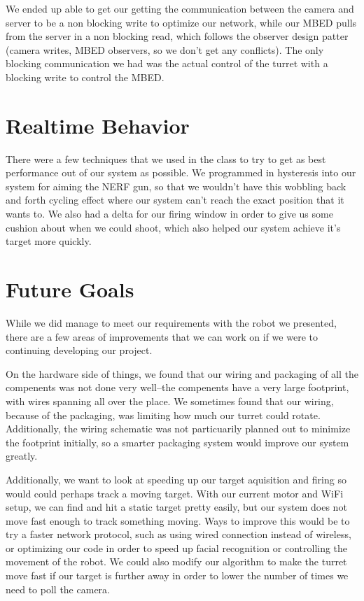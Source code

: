 \documentclass[journal]{IEEEtran}
\begin{document}
We ended up able to get our getting the communication between the camera and server to be a non blocking write to optimize our network, while our MBED pulls from the server in a non blocking read, which follows the observer design patter (camera writes, MBED observers, so we don't get any conflicts). The only blocking communication we had was the actual control of the turret with a blocking write to control the MBED.



\section{Realtime Behavior}
There were a few techniques that we used in the class to try to get as best performance out of our system as possible. We programmed in hysteresis into our system for aiming the NERF gun, so that we wouldn't have this wobbling back and forth cycling effect where our system can't reach the exact position that it wants to. We also had a delta for our firing window in order to give us some cushion about when we could shoot, which also helped our system achieve it's target more quickly.

\section{Future Goals}

While we did manage to meet our requirements with the robot we presented, there are a few areas of improvements that we can work on if we were to continuing developing our project.

On the hardware side of things, we found that our wiring and packaging of all the compenents was not done very well--the compenents have a very large footprint, with wires spanning all over the place. We sometimes found that our wiring, because of the packaging, was limiting how much our turret could rotate. Additionally, the wiring schematic was not particuarily planned out to minimize the footprint initially, so a smarter packaging system would improve our system greatly.

Additionally, we want to look at speeding up our target aquisition and firing so would could perhaps track a moving target. With our current motor and WiFi setup, we can find and hit a static target pretty easily, but our system does not move fast enough to track something moving. Ways to improve this would be to try a faster network protocol, such as using wired connection instead of wireless, or optimizing our code in order to speed up facial recognition or controlling the movement of the robot. We could also modify our algorithm to make the turret move fast if our target is further away in order to lower the number of times we need to poll the camera.


\nocite{*}



\end{document}
